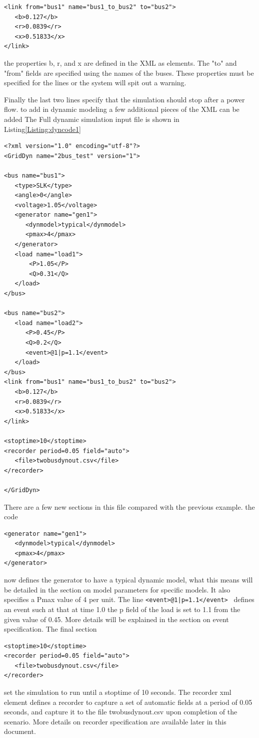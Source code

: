 \documentclass[12pt]{article} %
\begin{document}
\begin{lstlisting}
<link from="bus1" name="bus1_to_bus2" to="bus2">
   <b>0.127</b>
   <r>0.0839</r>
   <x>0.51833</x>
</link>
\end{lstlisting}
the properties b, r, and x are defined in the XML as elements.  The "to" and "from" fields are specified using the names of the buses.  These properties must be specified for the lines or the system will spit out a warning. 

Finally the last two lines specify that the simulation should stop after a power flow.  
to add in dynamic modeling a few additional pieces of the XML can be added The Full dynamic simulation input file is shown in Listing\ref{Listing:dyncode1}

\begin{lstlisting}[label={Listing:dyncode1}]
<?xml version="1.0" encoding="utf-8"?>
<GridDyn name="2bus_test" version="1">

<bus name="bus1">
   <type>SLK</type>
   <angle>0</angle>
   <voltage>1.05</voltage>
   <generator name="gen1">
      <dynmodel>typical</dynmodel>
      <pmax>4</pmax>
   </generator>
   <load name="load1">
       <P>1.05</P>
       <Q>0.31</Q>
   </load>
</bus>

<bus name="bus2">
   <load name="load2">
      <P>0.45</P>
      <Q>0.2</Q>
      <event>@1|p=1.1</event>
   </load>
</bus>
<link from="bus1" name="bus1_to_bus2" to="bus2">
   <b>0.127</b>
   <r>0.0839</r>
   <x>0.51833</x>
</link>

<stoptime>10</stoptime>
<recorder period=0.05 field="auto">
   <file>twobusdynout.csv</file>
</recorder>

</GridDyn>
\end{lstlisting}

There are a few new sections in this file compared with the previous example.  
the code 
\begin{lstlisting}
<generator name="gen1">
   <dynmodel>typical</dynmodel>
   <pmax>4</pmax>
</generator>
\end{lstlisting}
now defines the generator to have a typical dynamic model, what this means will be detailed in the section on model parameters for specific models. It also specifies a Pmax value of 4 per unit.  
The line {\tt <event>@1|p=1.1</event> } defines an event such at that at time 1.0 the p field of the load is set to 1.1 from the given value of 0.45.  More details will be explained in the section on event specification.  
The final section
\begin{lstlisting}[label={lst:recorder}]
<stoptime>10</stoptime>
<recorder period=0.05 field="auto">
   <file>twobusdynout.csv</file>
</recorder>
\end{lstlisting}
set the simulation to run until a stoptime of 10 seconds.    The recorder xml element defines a recorder to capture a set of automatic fields at a period of 0.05 seconds, and capture it to the file twobusdynout.csv upon completion of the scenario.  More details  on recorder specification are available later in this document.  
\end{document}
